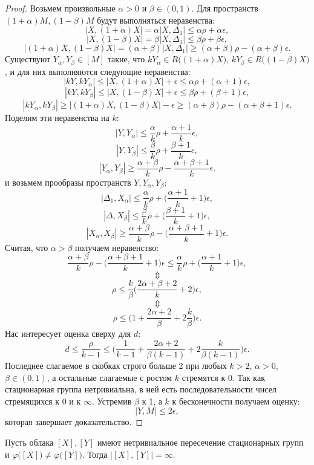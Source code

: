 \begin{proof}
	Возьмем произвольные $\alpha > 0$ и $\beta \in (0,1)$. Для пространств $(1+\alpha)M, (1-\beta)M$ будут выполняться неравенства:
	$$|X, (1+\alpha)X| = \alpha |X, \Delta_1| \le \alpha\rho + \alpha\epsilon,$$
	$$|X, (1-\beta)X| = \beta|X, \Delta_1| \le \beta\rho + \beta\epsilon,$$
	$$|(1+\alpha) X, (1-\beta)X| = (\alpha + \beta)|X, \Delta_1| \ge (\alpha+\beta)\rho - (\alpha+\beta)\epsilon.$$
	Существуют
	$Y_\alpha, Y_\beta \in [M]$ такие, что
	$kY_\alpha \in R\big((1+\alpha)X\big)$, $kY_\beta \in R\big((1-\beta)X\big)$, и
	для них выполняются следующие неравенства:
	$$|kY, kY_\alpha| \le |X, (1+\alpha)X| + \epsilon \le \alpha\rho + (\alpha+1)\epsilon,$$
	$$|kY, kY_\beta| \le |X, (1-\beta)X| + \epsilon \le \beta\rho + (\beta+1)\epsilon,$$
	$$|kY_\alpha, kY_\beta| \ge |(1+\alpha)X, (1-\beta)X| - \epsilon \ge  (\alpha+\beta)\rho - (\alpha+\beta+1)\epsilon.$$
	Поделим эти неравенства на $k$:
	$$|Y, Y_{\alpha}| \le \frac{\alpha}{k}\rho + \frac{\alpha+1}{k}\epsilon,$$
	$$|Y, Y_{\beta}| \le \frac{\beta}{k}\rho + \frac{\beta+1}{k}\epsilon,$$
	$$|Y_\alpha, Y_{\beta}| \ge \frac{\alpha+\beta}{k}\rho - \frac{\alpha+\beta+1}{k}\epsilon.$$
	и возьмем прообразы пространств $Y, Y_{\alpha}, Y_{\beta}$:
	$$|\Delta_1, X_{\alpha}| \le \frac{\alpha}{k}\rho + \big(\frac{\alpha+1}{k} + 1\big)\epsilon,$$
	$$|\Delta, X_{\beta}| \le \frac{\beta}{k}\rho + \big(\frac{\beta+1}{k}+1\big)\epsilon,$$
	$$|X_\alpha, X_{\beta}| \ge \frac{\alpha+\beta}{k}\rho - \big(\frac{\alpha+\beta+1}{k}+1\big)\epsilon.$$
	Считая, что $\alpha > \beta$ получаем неравенство:
	$$\frac{\alpha+\beta}{k}\rho - \big(\frac{\alpha+\beta+1}{k}+1\big)\epsilon \le \frac{\alpha}{k}\rho + \big(\frac{\alpha+1}{k} + 1\big)\epsilon,$$
	$$\Updownarrow$$
	$$\rho \le \frac{k}{\beta}\bigg(\frac{2\alpha+\beta+2}{k}+2\bigg)\epsilon,$$
	$$\Updownarrow$$
	$$\rho \le \bigg(1+\frac{2\alpha + 2}{\beta} + 2\frac{k}{\beta}\bigg)\epsilon.$$
	Нас интересует оценка сверху для $d$:
	$$d \le \frac{\rho}{k-1} \le \bigg(\frac{1}{k-1}+\frac{2\alpha + 2}{\beta(k-1)} + 2\frac{k}{\beta(k-1)}\bigg)\epsilon. $$
	Последнее слагаемое в скобках строго больше 2 при любых $k>2$, $\alpha>0$,
	$\beta\in (0,1)$, а остальные слагаемые с ростом $k$ стремятся к $0$. Так как стационарная группа нетривиальна, в ней есть последовательности чисел стремящихся к 0 и к $\infty$.
	Устремив $\beta$ к 1, а $k$ к бесконечности получаем оценку:
	$$|Y, M| \le 2\epsilon,$$
	которая завершает доказательство.
	
\end{proof}

\begin{theorem}
  Пусть облака $[X],[Y]$ имеют нетривиальное пересечение стационарных групп и $\varphi\big([X]\big)\neq \varphi\big([Y]\big)$. Тогда $\big|[X],[Y]\big|=\infty$.
\end{theorem}

